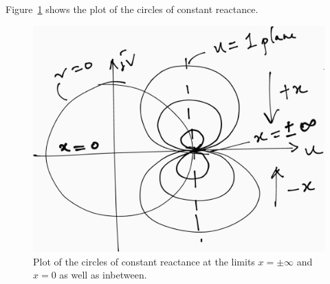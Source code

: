 Figure~\ref{fig:uytrdbn} shows the plot of the circles of constant reactance.
\begin{figure}[h]
\centering
\includegraphics[width=0.7\linewidth]{./graphics/circle_of_constant_reactance_temp.png}
\caption{Plot of the circles of constant reactance at the limits $x = \pm\infty$ and $x = 0$ as well as inbetween.}
\label{fig:uytrdbn}
\end{figure}

